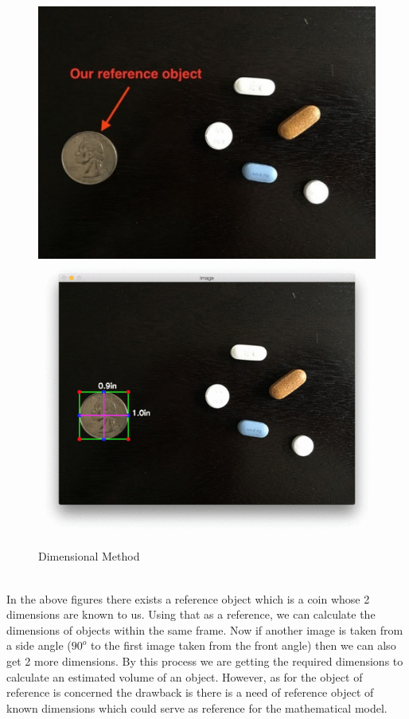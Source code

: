 \begin{figure}[!hb]
   \centering
   \includegraphics[scale=0.8]{images/q1.png}
   \includegraphics[scale=0.3]{images/q2.png}
   
   \caption{Dimensional Method}\label{fig:picture}
\end{figure}
\\
In the above figures there exists a reference object which is a coin whose 2 dimensions are known to us. Using that as a reference, we can calculate the dimensions of objects within the same frame. Now if another image is taken from a side angle ($90^{o}$ to the first image taken from the front angle) then we can also get 2 more dimensions. By this process we are getting the required dimensions to calculate an estimated volume of an object. However, as for the object of reference is concerned the drawback is there is a need of  reference object of known dimensions which could serve as reference for the mathematical model.\\
